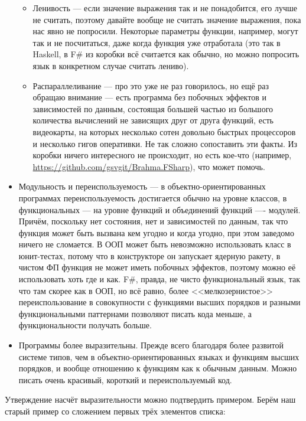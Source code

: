 \documentclass{../../text-style}
\begin{document}
\begin{itemize}
    \begin{itemize}
        \item Ленивость --- если значение выражения так и не понадобится, его лучше не считать, поэтому давайте вообще не считать значение выражения, пока нас явно не попросили. Некоторые параметры функции, например, могут так и не посчитаться, даже когда функция уже отработала (это так в Haskell, в F\# из коробки всё считается как обычно, но можно попросить язык в конкретном случае считать лениво).
        \item Распараллеливание --- про это уже не раз говорилось, но ещё раз обращаю внимание --- есть программа без побочных эффектов и зависимостей по данным, состоящая большей частью из большого количества вычислений не зависящих друг от друга функций, есть видеокарты, на которых несколько сотен довольно быстрых процессоров и несколько гигов оперативки. Не так сложно сопоставить эти факты. Из коробки ничего интересного не происходит, но есть кое-что (например, \url{https://github.com/gsvgit/Brahma.FSharp}), что может помочь.
    \end{itemize}
    \item Модульность и переиспользуемость --- в объектно-ориентированных программах переиспользуемость достигается обычно на уровне классов, в функциональных --- на уровне функций и объединений функций ---- модулей. Причём, поскольку нет состояния, нет и зависимостей по данным, так что функция может быть вызвана кем угодно и когда угодно, при этом заведомо ничего не сломается. В ООП может быть невозможно использовать класс в юнит-тестах, потому что в конструкторе он запускает ядерную ракету, в чистом ФП функция не может иметь побочных эффектов, поэтому можно её использовать хоть где и как. F\#, правда, не чисто функциональный язык, так что там скорее как в ООП, но всё равно, более <<мелкозернистое>> переиспользование в совокупности с функциями высших порядков и разными функциональными паттернами позволяют писать кода меньше, а функциональности получать больше.
    \item Программы более выразительны. Прежде всего благодаря более развитой системе типов, чем в объектно-ориентированных языках и функциям высших порядков, и вообще отношению к функциям как к обычным данным. Можно писать очень красивый, короткий и переиспользуемый код.
\end{itemize}

Утверждение насчёт выразительности можно подтвердить примером. Берём наш старый пример со сложением первых трёх элементов списка:
\end{document}
